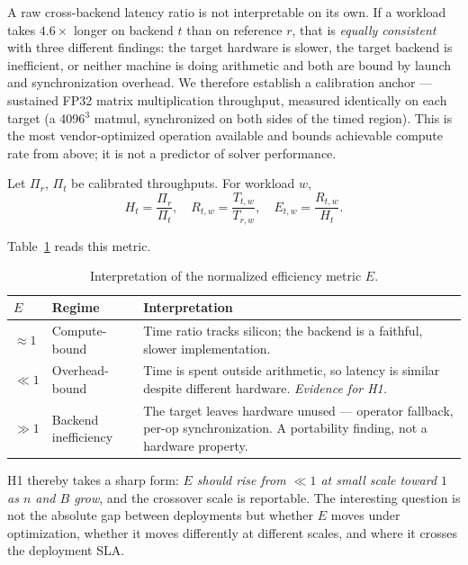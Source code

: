 \documentclass[11pt,a4paper,twocolumn]{article}
\begin{document}
A raw cross-backend latency ratio is not interpretable on its own. If a workload
takes $4.6\times$ longer on backend $t$ than on reference $r$, that is \emph{equally
consistent} with three different findings: the target hardware is slower, the target
backend is inefficient, or neither machine is doing arithmetic and both are bound
by launch and synchronization overhead. We therefore establish a calibration anchor
--- sustained FP32 matrix multiplication throughput, measured identically on each
target (a 4096$^3$ matmul, synchronized on both sides of the timed region). This is
the most vendor-optimized operation available and bounds achievable compute rate
from above; it is not a predictor of solver performance.

Let $\Pi_r$, $\Pi_t$ be calibrated throughputs. For workload $w$,
\begin{equation}
  H_t = \frac{\Pi_r}{\Pi_t}, \quad
  R_{t,w} = \frac{T_{t,w}}{T_{r,w}}, \quad
  E_{t,w} = \frac{R_{t,w}}{H_t}.
\end{equation}

Table~\ref{tab:E} reads this metric.

\begin{table}[t]
\centering
\footnotesize
\begin{tabular}{@{}l p{}p{}@{}}
\toprule
$E$ & \textbf{Regime} & \textbf{Interpretation} \\
\midrule
$\approx 1$ & Compute-bound & Time ratio tracks silicon; the backend is a faithful,
slower implementation. \\
$\ll 1$ & Overhead-bound & Time is spent outside arithmetic, so latency is similar
despite different hardware. \emph{Evidence for H1.} \\
$\gg 1$ & Backend inefficiency & The target leaves hardware unused --- operator
fallback, per-op synchronization. A portability finding, not a hardware property. \\
\bottomrule
\end{tabular}
\caption{Interpretation of the normalized efficiency metric $E$.}
\label{tab:E}
\end{table}

H1 thereby takes a sharp form: \emph{$E$ should rise from $\ll 1$ at small scale
toward $1$ as $n$ and $B$ grow}, and the crossover scale is reportable. The
interesting question is not the absolute gap between deployments but whether $E$
moves under optimization, whether it moves differently at different scales, and
where it crosses the deployment SLA.
\end{document}
